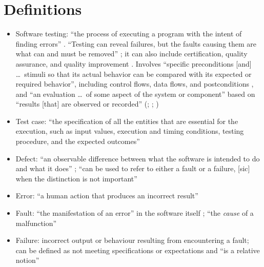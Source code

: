 \section{Definitions}

\begin{itemize}
      \item Software testing: ``the process of executing a program with the
            intent of finding errors'' \citep[p.~438]{PetersAndPedrycz2000}
            . ``Testing can reveal
            failures, but the faults causing them are what can and must be
            removed'' \citep[p.~5-3]{SWEBOK2024}; it can also include
            certification, quality assurance, and quality improvement
            \citep[p.~5-4]{SWEBOK2024}. Involves ``specific preconditions
                  [and] \dots\ stimuli so that its actual behavior can be
            compared with its expected or required behavior'', including
            control flows, data flows, and postconditions
            \citep[p.~11]{Firesmith2015}, and ``an evaluation \dots\ of some
            aspect of the system or component'' based on ``results [that]
            are observed or recorded'' (\citealp[p.~10]{IEEE2022};
            \citeyear[p.~6]{IEEE2021}; \citeyear[p.~465]{IEEE2017}
            )
      \item Test case: ``the specification of all the entities
            that are essential for the execution, such as input values,
            execution and timing conditions, testing procedure, and the
            expected outcomes'' \citep[pp.~5-1 to 5-2]{SWEBOK2024}
      \item Defect: ``an observable difference between what the software is
            intended to do and what it does'' \citep[p.~1-1]{SWEBOK2024}; ``can
            be used to refer to either a fault or a failure, [sic] when the
            distinction is not important'' \citep[p.~4-3]{SWEBOK2014}
      \item Error: ``a human action that produces an incorrect result''
            \citep[p.~399]{vanVliet2000}
      \item Fault: ``the manifestation of an error'' in the software itself
            \citep[p.~400]{vanVliet2000}; ``the \emph{cause} of a malfunction''
            \citep[p.~5-3]{SWEBOK2024}
      \item Failure: incorrect output or behaviour resulting from encountering
            a fault; can be defined as not meeting specifications or
            expectations and ``is a relative notion''

\end{itemize}
